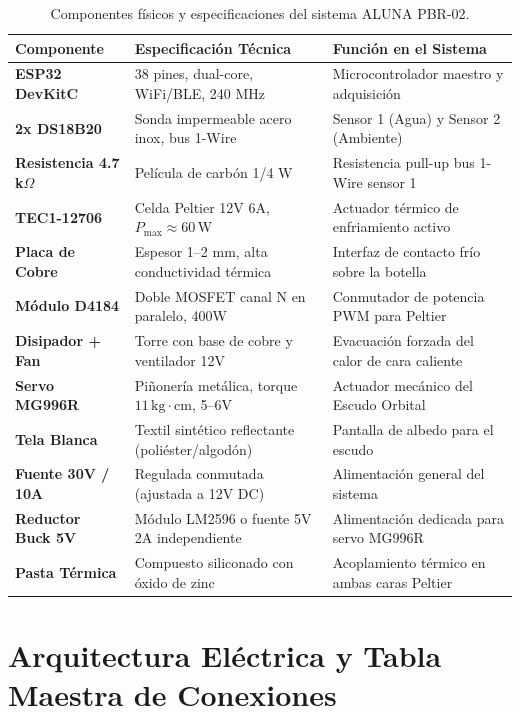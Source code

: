 \documentclass[11pt,letterpaper]{article}
\begin{document}
\begin{table}[h!]
\centering
\caption{Componentes físicos y especificaciones del sistema ALUNA PBR-02.}
\label{tab:bom}
\begin{tabular}{lp{6cm}p{4cm}}
\toprule
\textbf{Componente} & \textbf{Especificación Técnica} & \textbf{Función en el Sistema} \\
\midrule
\textbf{ESP32 DevKitC} & 38 pines, dual-core, WiFi/BLE, 240 MHz & Microcontrolador maestro y adquisición \\
\textbf{2x DS18B20} & Sonda impermeable acero inox, bus 1-Wire & Sensor 1 (Agua) y Sensor 2 (Ambiente) \\
\textbf{Resistencia 4.7 k$\Omega$} & Película de carbón 1/4 W & Resistencia pull-up bus 1-Wire sensor 1 \\
\textbf{TEC1-12706} & Celda Peltier 12V 6A, $P_{\max} \approx 60\,\text{W}$ & Actuador térmico de enfriamiento activo \\
\textbf{Placa de Cobre} & Espesor 1--2 mm, alta conductividad térmica & Interfaz de contacto frío sobre la botella \\
\textbf{Módulo D4184} & Doble MOSFET canal N en paralelo, 400W & Conmutador de potencia PWM para Peltier \\
\textbf{Disipador + Fan} & Torre con base de cobre y ventilador 12V & Evacuación forzada del calor de cara caliente \\
\textbf{Servo MG996R} & Piñonería metálica, torque $11\,\text{kg}\cdot\text{cm}$, 5--6V & Actuador mecánico del Escudo Orbital \\
\textbf{Tela Blanca} & Textil sintético reflectante (poliéster/algodón) & Pantalla de albedo para el escudo \\
\textbf{Fuente 30V / 10A} & Regulada conmutada (ajustada a 12V DC) & Alimentación general del sistema \\
\textbf{Reductor Buck 5V} & Módulo LM2596 o fuente 5V 2A independiente & Alimentación dedicada para servo MG996R \\
\textbf{Pasta Térmica} & Compuesto siliconado con óxido de zinc & Acoplamiento térmico en ambas caras Peltier \\
\bottomrule
\end{tabular}
\end{table}

\section{Arquitectura Eléctrica y Tabla Maestra de Conexiones}
\end{document}
